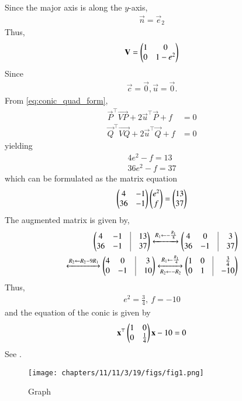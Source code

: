 Since the major axis is along the $y$-axis,
\begin{align}
\vec{n} = \vec{e}_2
\end{align}
Thus,
\begin{align}
\mathbf{V} = \begin{pmatrix}1&0\\0&1-e^2\end{pmatrix} \label{eq:chapters/11/11/3/19/5} 
\end{align}
Since
\begin{align}
\vec{c} = \vec{0}, \vec{u}=\vec{0}.
\label{eq:chapters/11/11/3/19/8}
\end{align}
    From \eqref{eq:conic_quad_form},
    \begin{align}
        \vec{P}^\top\vec{VP} + 2\vec{u}^\top\vec{P} + f &= 0 \label{eq:chapters/11/11/3/19/ep1} \\
        \vec{Q}^\top\vec{VQ} + 2\vec{u}^\top\vec{Q} + f &= 0 \label{eq:chapters/11/11/3/19/ep2}
    \end{align}
    yielding
\begin{align}
4e^2 - f = 13 \label{eq:chapters/11/11/3/19/10}
\\
36e^2 - f = 37 \label{eq:chapters/11/11/3/19/11}
\end{align}
which can be formulated as the matrix equation
\begin{align}
\begin{pmatrix}4&-1\\36&-1\end{pmatrix}\begin{pmatrix}e^2\\f\end{pmatrix} = \begin{pmatrix}13\\37\end{pmatrix}
\label{eq:chapters/11/11/3/19/12}
\end{align}
The augmented matrix is given by,
\begin{align*}
\myvec{4&-1&\vline&13\\36&-1&\vline&37}
\xleftrightarrow[]{R_1\leftarrow-\frac{R_1}{8}} \myvec{4&0&\vline&3\\36&-1&\vline&37} 
\\
\xleftrightarrow[]{R_2\leftarrow R_2-9R_1}
\myvec{4&0&\vline&3\\0&-1&\vline&10} 
\xleftrightarrow[R_2\leftarrow -R_2]{R_1\leftarrow \frac{R_1}{4}}
\myvec{1&0&\vline&\frac{3}{4}\\0&1&\vline&-10}
\end{align*}
Thus,
\begin{align}
e^2 = \frac{3}{4},\ f = -10
\end{align}
and the equation of the conic is given by
\begin{align}
\mathbf{x}^\top\begin{pmatrix}1&0\\0&\frac{1}{4}\end{pmatrix}\mathbf{x} - 10 = 0
\end{align}
See  
.
\begin{figure}[H]
\centering
\texttt{[image: chapters/11/11/3/19/figs/fig1.png]}
\caption{Graph}
\label{fig:chapters/11/11/3/19/1}
\end{figure}
